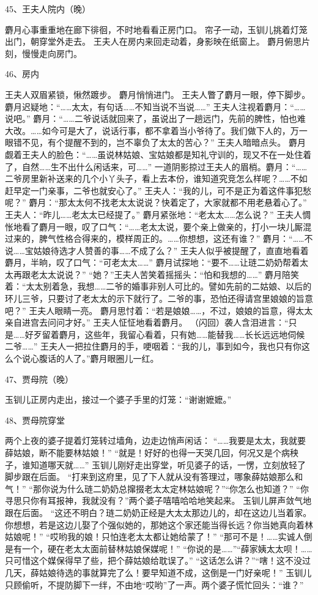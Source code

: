 45、王夫人院内（晚）\par 
麝月心事重重地在廊下徘徊，不时地看看正房门口。 
帘子一动，玉钏儿挑着灯笼出门，朝穿堂外走去。 
王夫人在房内来回走动着，身影映在纸窗上。 
麝月俯思片刻，慢慢走向房门。 

46、房内\par 
王夫人双眉紧锁，愀然踱步。 麝月悄悄进门。 
王夫人瞥了麝月一眼，停下脚步。 麝月迟疑地：“……太太，有句话……不知当说不当说……” 
王夫人注视着麝月：“……说吧。” 麝月：“……二爷说话就回来了，虽说出了一趟远门，先前的脾性，怕也难大改。……如今可是大了，说话行事，都不拿着当小爷待了。我们做下人的，万一眼错不见，有个提醒不到的，岂不辜负了太太的苦心？” 
王夫人暗暗点头。 麝月觑着王夫人的脸色：“……虽说林姑娘、宝姑娘都是知礼守训的，现又不在一处住着了，自然……生不出什么闲话来，可……” 
一道阴影掠过王夫人的眉梢。麝月：“……二爷房里新补送来的几个小丫头子，看上去本份，谁知道究竞怎么样呢？……不如赶早定一门亲事，二爷也就安心了。” 
王夫人：“我的儿，可不是正为着这件事犯愁呢？” 麝月：“那太太何不找老太太说说？快着定了，大家就都不用老悬着心了。” 
王夫人：“昨儿……老太太已经提了。” 麝月紧张地：“老太太……怎么说？” 
王夫人惆怅地看了麝月一眼，叹了口气：“……老太太说，要个亲上做亲的，打小一块儿厮混过来的，脾气性格合得来的，模样周正的。……你想想，这还有谁？” 
麝月：“……不说……宝姑娘待选才人赞善的事……不成了么？” 
王夫人似乎被提醒了，直直地看着麝月，半晌，叹了口气：“可老太太……” 
麝月试探地：“要不……让琏二奶奶帮着太太再跟老太太说说？” 
“她？”王夫人苦笑着摇摇头：“怕和我想的……” 
麝月陪笑着：“太太别着急，我想……二爷的婚事非别人可比的。譬如先前的二姑娘、以后的环儿三爷，只要讨了老太太的示下就行了。二爷的事，恐怕还得请宫里娘娘的旨意吧？” 
王夫人眼睛一亮。 麝月思忖着：“若是娘娘……，不过，娘娘的旨意，得太太亲自进宫去问问才好。” 
王夫人怔怔地看着麝月。 （闪回）袭人含泪进言：“只是……好歹留着麝月，这些年，我留心看着，只有她……能替我……长长远远地伺候二爷……” 
王夫人一把拉住麝月的手，哽咽着：“我的儿，事到如今，我也只有你这么个说心腹话的人了。”麝月眼圈儿一红。 

47、贾母院（晚）\par 
玉钏儿正房内走出，接过一个婆子手里的灯笼：“谢谢嬷嬷。” 

48、贾母院穿堂\par 
两个上夜的婆子提着灯笼转过墙角，边走边悄声闲话： 
“……我要是太太，我就要薛姑娘，断不能要林姑娘！” 
“就是！好好的也得一天哭几回，何况又是个病秧子，谁知道哪天就……” 
玉钏儿刚好走出穿堂，听见婆子的话，一愣，立刻放轻了脚步跟在后面。 
“打来到这府里，见了下人就从没有答理过，哪象薛姑娘那么和气！”
“那你说为什么琏二奶奶总撺掇老太太定林姑娘呢？”“你怎么也知道？” 
“你寻思只你有耳报神，我就没有？”两个婆子嘻嘻哈哈地笑起来。 
玉钏儿屏声敛气地跟在后面。 “这还不明白？琏二奶奶正经是大太太那边儿的，却在这边儿当着家。你想想，若是这边儿娶了个强似她的，那她这个家还能当得长远？你当她真向着林姑娘呢！” 
“哎哟我的娘！只怕连老太太都让她给蒙了！” 
“那可不是！……实诚人倒是有一个，硬在老太太面前替林姑娘保媒呢！” 
“你说的是……”“薛家姨太太呗！……只可惜这个媒保得早了些，把个薛姑娘给耽误了。” 
“这话怎么讲？”“嗐！这不没过几天，薛姑娘待选的事就算完了么！要早知道不成，这倒是一门好亲呢！” 
玉钏儿只顾偷听，不提防脚下一绊，不由地“哎哟”了一声。两个婆子慌忙回头：“谁？” 

